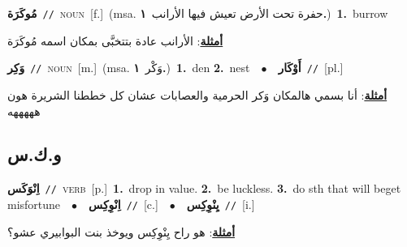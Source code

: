 \documentclass[10pt,a4paper,twoside]{article} %
\begin{document}
\begin{multicols}{2}
{\setlength\topsep{0pt}\textbf{\foreignlanguage{arabic}{مُوكَرَة}}\ {\color{gray}\texttt{//}\color{black}}\ \textsc{noun}\ [f.]\ \color{gray}(msa. \foreignlanguage{arabic}{حفرة تحت الأرض تعيش فيها الأرانب}~\foreignlanguage{arabic}{\textbf{١.}})\color{black}\ \textbf{1.}~burrow\  \begin{flushright}\color{gray}\foreignlanguage{arabic}{\textbf{\underline{\foreignlanguage{arabic}{أمثلة}}}: الأرانب عادة بتتخبَّى بمكان اسمه مُوكَرَة}\end{flushright}\color{black}} \vspace{2mm}

{\setlength\topsep{0pt}\textbf{\foreignlanguage{arabic}{وَكِر}}\ {\color{gray}\texttt{//}\color{black}}\ \textsc{noun}\ [m.]\ \color{gray}(msa. \foreignlanguage{arabic}{وَكْر}~\foreignlanguage{arabic}{\textbf{١.}})\color{black}\ \textbf{1.}~den  \textbf{2.}~nest\ \ $\bullet$\ \ \setlength\topsep{0pt}\textbf{\foreignlanguage{arabic}{أَوْكَار}}\ {\color{gray}\texttt{//}\color{black}}\ [pl.]\  \begin{flushright}\color{gray}\foreignlanguage{arabic}{\textbf{\underline{\foreignlanguage{arabic}{أمثلة}}}: أنا بسمي هالمكان وَكر الحرمية والعصابات عشان كل خططنا الشريرة هون هههههه}\end{flushright}\color{black}} \vspace{2mm}

\vspace{-3mm}
\subsection*{\color{blue}\foreignlanguage{arabic}{و.ك.س}\color{blue}{}} 

{\setlength\topsep{0pt}\textbf{\foreignlanguage{arabic}{اِنْوَكَس}}\ {\color{gray}\texttt{//}\color{black}}\ \textsc{verb}\ [p.]\ \textbf{1.}~drop in value.  \textbf{2.}~be luckless.  \textbf{3.}~do sth that will beget misfortune\ \ $\bullet$\ \ \setlength\topsep{0pt}\textbf{\foreignlanguage{arabic}{اِنْوِكِس}}\ {\color{gray}\texttt{//}\color{black}}\ [c.]\ \ $\bullet$\ \ \setlength\topsep{0pt}\textbf{\foreignlanguage{arabic}{يِنْوِكِس}}\ {\color{gray}\texttt{//}\color{black}}\ [i.]\  \begin{flushright}\color{gray}\foreignlanguage{arabic}{\textbf{\underline{\foreignlanguage{arabic}{أمثلة}}}: هو راح يِنْوِكِس ويوخذ بنت البوابيري عشو؟}\end{flushright}\color{black}} \vspace{2mm}


\end{multicols}
\end{document}
